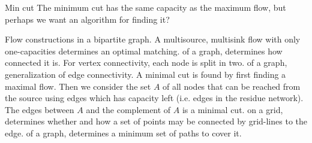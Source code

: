 \begin{algorithm}{Min cut}
\desc
The minimum cut has the same capacity as the maximum flow,
but perhaps we want an algorithm for finding it?
\end{algorithm}

\begin{algorithm}{Flow constructions}
 in a bipartite graph. A multisource, multisink flow
with only one-capacities determines an optimal matching.
 of a graph, determines how connected
it is. For vertex connectivity, each node is split in two.
 of a graph, generalization of edge connectivity. A
minimal cut is found by first finding a maximal flow. Then we consider the
set $A$ of all nodes that can be reached from the source using edges which
has capacity left (i.e. edges in the residue network). The edges between
$A$ and the complement of $A$ is a minimal cut.
 on a grid, determines whether and how a set of
points may be connected by grid-lines to the edge.
 of a graph, determines a minimum set of paths to
cover it.
\end{algorithm}
